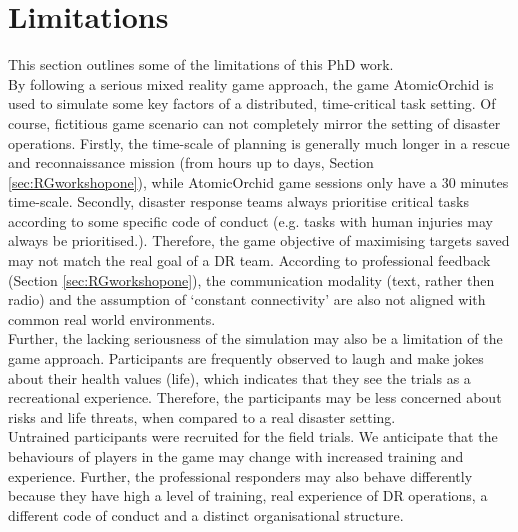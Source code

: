 
\section{Limitations}
This section outlines some of the limitations of this PhD work. \\

By following a serious mixed reality game approach, the game AtomicOrchid is used to simulate some key factors of a distributed, time-critical task setting.  Of course, fictitious game scenario can not completely mirror the setting of disaster operations. Firstly, the time-scale of planning is generally much longer in a rescue and reconnaissance mission (from hours up to days, Section \ref{sec:RGworkshopone}), while AtomicOrchid game sessions only have a 30 minutes time-scale. Secondly, disaster response teams always prioritise critical tasks according to some specific code of conduct (e.g. tasks with human injuries may always be prioritised.). Therefore, the game objective of maximising targets saved may not match the real goal of a \ac{DR} team. According to professional feedback (Section \ref{sec:RGworkshopone}), the communication modality (text, rather then radio) and the assumption of `constant connectivity' are also not aligned with common real world environments. \\

Further, the lacking seriousness of the simulation may also be a limitation of the game approach. Participants are frequently observed to laugh and make jokes about their health values (life), which indicates that they see the trials as a recreational experience. Therefore, the participants may be less concerned about risks and life threats, when compared to a real disaster setting. \\

Untrained participants were recruited for the field trials. We anticipate that the behaviours of players in the game may change with increased training and experience. Further, the professional responders may also behave differently because they have high a level of training, real experience of \ac{DR} operations, a different code of conduct and a distinct organisational structure.\\

